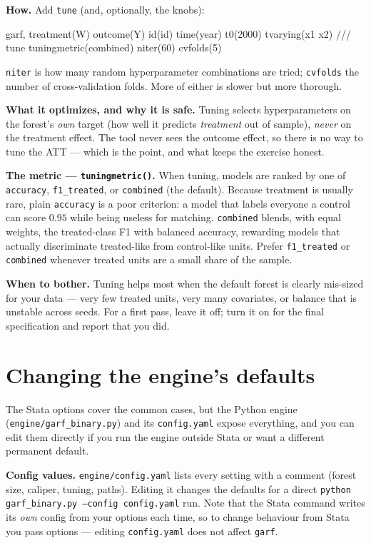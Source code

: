 \documentclass[11pt,a4paper]{article}
\newcommand{\code}[1]{\texttt{#1}}
\begin{document}
\medskip
\noindent\textbf{How.} Add \code{tune} (and, optionally, the knobs):
\begin{stata}
garf, treatment(W) outcome(Y) id(id) time(year) t0(2000) tvarying(x1 x2) ///
      tune tuningmetric(combined) niter(60) cvfolds(5)
\end{stata}
\code{niter} is how many random hyperparameter combinations are tried; \code{cvfolds} the number
of cross-validation folds. More of either is slower but more thorough.

\medskip
\noindent\textbf{What it optimizes, and why it is safe.} Tuning selects hyperparameters on the
forest's \emph{own} target (how well it predicts \emph{treatment} out of sample), \emph{never} on
the treatment effect. The tool never sees the outcome effect, so there is no way to tune the ATT
--- which is the point, and what keeps the exercise honest.

\medskip
\noindent\textbf{The metric --- \code{tuningmetric()}.} When tuning, models are ranked by one of
\code{accuracy}, \code{f1\_treated}, or \code{combined} (the default). Because treatment is
usually rare, plain \code{accuracy} is a poor criterion: a model that labels everyone a control
can score $0.95$ while being useless for matching. \code{combined} blends, with equal weights, the treated-class F1
with balanced accuracy, rewarding models that actually discriminate treated-like from
control-like units. Prefer \code{f1\_treated} or \code{combined} whenever treated units are a
small share of the sample.

\medskip
\noindent\textbf{When to bother.} Tuning helps most when the default forest is clearly mis-sized
for your data --- very few treated units, very many covariates, or balance that is unstable
across seeds. For a first pass, leave it off; turn it on for the final specification and report
that you did.

\section{Changing the engine's defaults}

The Stata options cover the common cases, but the Python engine (\code{engine/garf\_binary.py})
and its \code{config.yaml} expose everything, and you can edit them directly if you run the
engine outside Stata or want a different permanent default.

\medskip
\noindent\textbf{Config values.} \code{engine/config.yaml} lists every setting with a comment
(forest size, caliper, tuning, paths). Editing it changes the defaults for a direct
\code{python garf\_binary.py --config config.yaml} run. Note that the Stata command writes its
\emph{own} config from your options each time, so to change behaviour from Stata you pass options
--- editing \code{config.yaml} does not affect \code{garf}.
\end{document}
